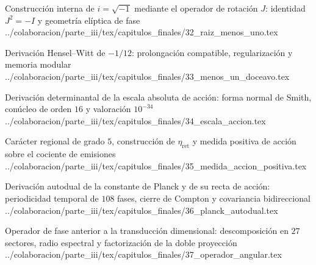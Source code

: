 \HMTSuccessorChapterInput
  {Construcción interna de \texorpdfstring{\(i=\sqrt{-1}\)}{i=sqrt(-1)} mediante el operador de rotación \texorpdfstring{\(J\)}{J}: identidad \texorpdfstring{\(J^2=-I\)}{J2=-I} y geometría elíptica de fase}
  {../colaboracion/parte_iii/tex/capitulos_finales/32_raiz_menos_uno.tex}

\HMTSuccessorChapterInput
  {Derivación Hensel--Witt de \texorpdfstring{\(-1/12\)}{-1/12}: prolongación compatible, regularización y memoria modular}
  {../colaboracion/parte_iii/tex/capitulos_finales/33_menos_un_doceavo.tex}

\HMTSuccessorChapterInput
  {Derivación determinantal de la escala absoluta de acción: forma normal de Smith, conúcleo de orden \(16\) y valoración \texorpdfstring{\(10^{-34}\)}{10^-34}}
  {../colaboracion/parte_iii/tex/capitulos_finales/34_escala_accion.tex}


\HMTSuccessorChapterInput
  {Carácter regional de grado \(5\), construcción de \texorpdfstring{\(\eta_{\mathrm{ret}}\)}{eta ret} y medida positiva de acción sobre el cociente de emisiones}
  {../colaboracion/parte_iii/tex/capitulos_finales/35_medida_accion_positiva.tex}


\HMTSuccessorChapterInput
  {Derivación autodual de la constante de Planck y de su recta de acción: periodicidad temporal de \(108\) fases, cierre de Compton y covariancia bidireccional}
  {../colaboracion/parte_iii/tex/capitulos_finales/36_planck_autodual.tex}




\HMTSuccessorChapterInput
  {Operador de fase anterior a la transducción dimensional: descomposición en \(27\) sectores, radio espectral y factorización de la doble proyección}
  {../colaboracion/parte_iii/tex/capitulos_finales/37_operador_angular.tex}

